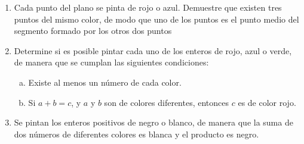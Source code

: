 \begin{enumerate}
	\item Cada punto del plano se pinta de rojo o azul. Demuestre que existen tres puntos del mismo color, de modo que uno de los puntos es el punto medio del segmento formado por los otros dos puntos
	
	\item Determine si es posible pintar cada uno de los enteros de rojo, azul o verde, de manera que se cumplan las siguientes condiciones:
	\begin{enumerate}[a.]
		\item Existe al menos un n\'umero de cada color.
		\item Si $ a+b = c$, y $a$ y $b$ son de colores diferentes, entonces $c$ es de color rojo.
	\end{enumerate}
	
	\item Se pintan los enteros positivos de negro o blanco, de manera que la suma de dos n\'umeros de diferentes colores es blanca y el producto es negro. 
\end{enumerate}